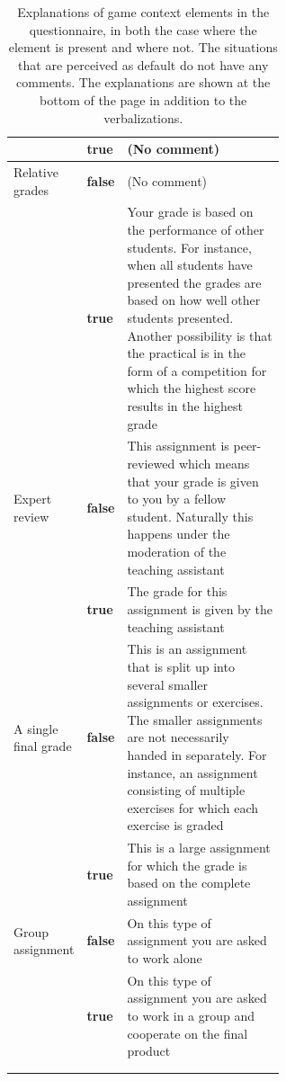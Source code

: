 \documentclass[11pt]{article}
\begin{document}
\begin{longtable}{ll p{0.6\linewidth}}
  & \textbf{true} & (No comment) \\ \hline
  Relative grades &  \textbf{false} & (No comment) \\
  & \textbf{true} & Your grade is based on the performance of other students. For instance, when all students have presented the grades are based on how well other students presented. Another possibility is that the practical is in the form of a competition for which the highest score results in the highest grade \\ \hline
  Expert review & \textbf{false} & This assignment is peer-reviewed which means that your grade is given to you by a fellow student. Naturally this happens under the moderation of the teaching assistant \\
 & \textbf{true} & The grade for this assignment is given by the teaching assistant \\ \hline
  A single final grade & \textbf{false} & This is an assignment that is split up into several smaller assignments or exercises. The smaller assignments are not necessarily handed in separately. For instance, an assignment consisting of multiple exercises for which each exercise is graded \\
  & \textbf{true} & This is a large assignment for which the grade is based on the complete assignment \\ \hline
  Group assignment & \textbf{false} & On this type of assignment you are asked to work alone \\
  & \textbf{true} & On this type of assignment you are asked to work in a group and cooperate on the final product \\ 
  \bottomrule \\
  \caption{Explanations of game context elements in the questionnaire, in both the case where the element is present and where not. The situations that are perceived as default do not have any comments. The explanations are shown at the bottom of the page in addition to the verbalizations.}
  \label{tab:questionnaire_explanations}
\end{longtable}
\end{document}
